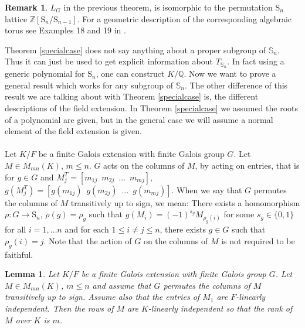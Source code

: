 \documentclass{article}
\theoremstyle{plain}
\newtheorem{lemma}[theorem]{Lemma}
\theoremstyle{definition}
\newtheorem*{remark}{Remark}
\newcommand{\Z}{\ensuremath{\mathbb{Z}}}
\newcommand{\Q}{\ensuremath{\mathbb{Q}}}
\begin{document}
\begin{remark}
$L_G$ in the previous theorem, is isomorphic to the permutation $\mathrm{S}_n$ lattice $\Z[\mathrm{S}_n/\mathrm{S}_{n-1}]$. For a geometric description of the corresponding algebraic torus see Examples 18 and 19 in \cite{Voskresenskii}.

\end{remark}
\noindent
Theorem \ref{specialcase} does not say anything about a proper subgroup of $\mathbb{S}_n$. Thus it can just be used to get explicit information about $T_{\mathbb{S}_n}$. In fact using a generic polynomial for $\mathrm{S}_n$, one can construct $K/\Q$. Now we want to prove a general result which works for any subgroup of $\mathbb{S}_n$. The other difference of this result we are talking about with Theorem \ref{specialcase} is, the different descriptions of the field extension. In Theorem \ref{specialcase} we assumed the roots of a polynomial are given, but in the general case we will assume a normal element of the field extension is given. \\
\\
Let $K/F$ be a finite Galois extension with finite Galois group $G$. Let $M \in M_{mn}(K)$, $m \leq n$. $G$ acts on the columns of $M$, by acting on entries, that is for $g \in G$ and $M^T_j = \left[m_{1j} \,\,\, m_{2j} \,\,\, \ldots \,\,\, m_{mj}\right]$, $g(M^T_j) = \left[g(m_{1j}) \,\,\, g(m_{2j}) \,\,\, \ldots \,\,\, g(m_{mj})\right]$. When we say that $G$ permutes the columns of $M$ transitively up to sign, we mean: There exists a homomorphism $\rho: G \longrightarrow \mathrm{S}_n$, $\rho(g) = \rho_g$ such that $g(M_i)= (-1)^{s_g}M_{\rho_g(i)}$ for some $s_g \in \lbrace 0, 1\rbrace$ for all $i = 1, \ldots n$ and for each $1 \leq i \neq j \leq n$, there exists $g \in G$ such that $\rho_g(i) = j$. Note that the action of $G$ on the columns of $M$ is not required to be faithful.
 \begin{lemma}\label{signdet}
Let $K/F$ be a finite Galois extension with finite Galois group $G$. Let $M \in M_{mn}(K)$, $m \leq n$ and assume that $G$ permutes the columns of $M$ transitively up to sign. Assume also that the entries of $M_1$ are $F$-linearly independent. Then the rows of $M$ are $K$-linearly independent so that the rank of $M$ over $K$ is $m$.
\end{lemma}
\end{document}
